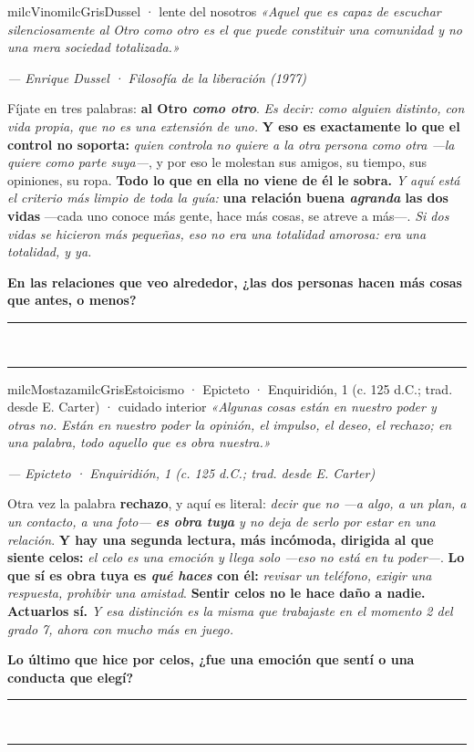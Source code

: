 \documentclass[11pt,letterpaper]{article}
\newcommand{\linead}[1]{\noindent\color{milcLinea}\rule{#1}{0.5pt}\color{milcNegro}}
\begin{document}
\begin{softbox}{milcVino}{milcGris}{Dussel · lente del nosotros}
\textit{«Aquel que es capaz de escuchar silenciosamente al Otro como otro es el que puede constituir una comunidad y no una mera sociedad totalizada.»}

{\footnotesize\itshape\color{milcNegro!70}--- Enrique Dussel · Filosofía de la liberación (1977)}

Fíjate en tres palabras: \textbf{al Otro \emph{como otro}}. \emph{Es decir: como alguien distinto, con vida propia, que no es una extensión de uno.} \textbf{Y eso es exactamente lo que el control no soporta:} \emph{quien controla no quiere a la otra persona como otra ---la quiere como parte suya---}, y por eso le molestan sus amigos, su tiempo, sus opiniones, su ropa. \textbf{Todo lo que en ella no viene de él le sobra.} \emph{Y aquí está el criterio más limpio de toda la guía:} \textbf{una relación buena \emph{agranda} las dos vidas} ---cada uno conoce más gente, hace más cosas, se atreve a más---. \emph{Si dos vidas se hicieron más pequeñas, eso no era una totalidad amorosa: era una totalidad, y ya.}

\textbf{En las relaciones que veo alrededor, ¿las dos personas hacen más cosas que antes, o menos?}
\end{softbox}
\linead{\linewidth}\\[1mm]
\linead{\linewidth}

\begin{softbox}{milcMostaza}{milcGris}{Estoicismo · Epicteto · Enquiridión, 1 (c. 125 d.C.; trad. desde E. Carter) · cuidado interior}
\textit{«Algunas cosas están en nuestro poder y otras no. Están en nuestro poder la opinión, el impulso, el deseo, el rechazo; en una palabra, todo aquello que es obra nuestra.»}

{\footnotesize\itshape\color{milcNegro!70}--- Epicteto · Enquiridión, 1 (c. 125 d.C.; trad. desde E. Carter)}

Otra vez la palabra \textbf{rechazo}, y aquí es literal: \emph{decir que no ---a algo, a un plan, a un contacto, a una foto--- \textbf{es obra tuya} y no deja de serlo por estar en una relación}. \textbf{Y hay una segunda lectura, más incómoda, dirigida al que siente celos:} \emph{el celo es una emoción y llega solo ---eso no está en tu poder---}. \textbf{Lo que sí es obra tuya es \emph{qué haces} con él:} \emph{revisar un teléfono, exigir una respuesta, prohibir una amistad}. \textbf{Sentir celos no le hace daño a nadie. Actuarlos sí.} \emph{Y esa distinción es la misma que trabajaste en el momento 2 del grado 7, ahora con mucho más en juego.}

\textbf{Lo último que hice por celos, ¿fue una emoción que sentí o una conducta que elegí?}
\end{softbox}
\linead{\linewidth}\\[1mm]
\linead{\linewidth}
\end{document}

